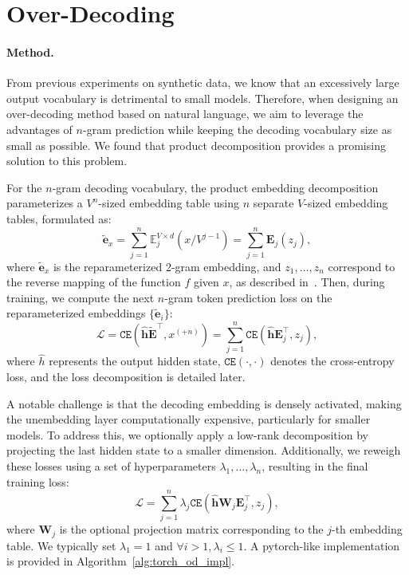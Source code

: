 \section{Over-Decoding}
\label{appendix:od}

\paragraph{Method.} From previous experiments on synthetic data, we know that an excessively large output vocabulary is detrimental to small models. Therefore, when designing an over-decoding method based on natural language, we aim to leverage the advantages of $n$-gram prediction while keeping the decoding vocabulary size as small as possible. We found that product decomposition provides a promising solution to this problem. 

For the $n$-gram decoding vocabulary, the product embedding decomposition parameterizes a $V^n$-sized embedding table using $n$ separate $V$-sized embedding tables, formulated as:
\begin{equation}
    \tilde{\mathbf{e}}_{x}=\sum_{j=1}^n\mathbb{E}^{V\times d}_j(x/V^{j-1})=\sum_{j=1}^n\mathbf{E}_j(z_{j}),
\end{equation}
where $\tilde{\mathbf{e}}_{x}$ is the reparameterized 2-gram embedding, and $z_1, \dots, z_n$ correspond to the reverse mapping of the function $f$ given $x$, as described in~. Then, during training,  we compute the next $n$-gram token prediction loss on the reparameterized embeddings $\{\tilde{\mathbf{e}}_i\}$:
\begin{equation}
    \mathcal{L}=\texttt{CE}(\mathbf{\hat{h}}\tilde{\mathbf{E}}^\top, x^{(+n)})=\sum_{j=1}^n\texttt{CE}(\mathbf{\hat{h}}\mathbf{E}_j^\top, z_j), \label{eq:od_loss_decomposition}
\end{equation}
where $\hat{h}$ represents the output hidden state, $\texttt{CE}(\cdot, \cdot)$ denotes the cross-entropy loss, and the loss decomposition is detailed later. 

A notable challenge is that the decoding embedding is densely activated, making the unembedding layer computationally expensive, particularly for smaller models. To address this, we optionally apply a low-rank decomposition by projecting the last hidden state to a smaller dimension. Additionally, we reweigh these losses using a set of hyperparameters $\lambda_1, \dots, \lambda_n$, resulting in the final training loss:
\begin{equation}
    \mathcal{L}=\sum_{j=1}^n\lambda_j\texttt{CE}(\mathbf{\hat{h}}\mathbf{W}_j\mathbf{E}_j^\top, z_j),
\end{equation}
where $\mathbf{W}_j$ is the optional projection matrix corresponding to the $j$-th embedding table. We typically set $\lambda_1=1$ and $\forall i>1, \lambda_i\leq 1$. A pytorch-like implementation is provided in Algorithm~\ref{alg:torch_od_impl}.

